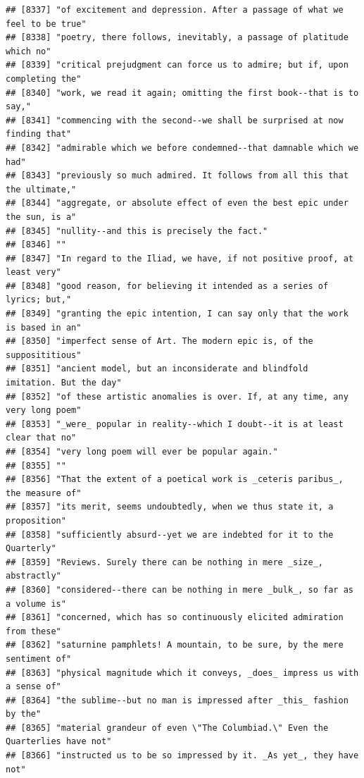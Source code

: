 \documentclass{article}\usepackage[]{graphicx}\usepackage[]{color}
\makeatletter
\newenvironment{kframe}{%
 \def\at@end@of@kframe{}%
 \ifinner\ifhmode%
  \def\at@end@of@kframe{\end{minipage}}%
  \begin{minipage}{\columnwidth}%
 \fi\fi%
 \def\FrameCommand##1{\hskip\@totalleftmargin \hskip-\fboxsep
 \colorbox{shadecolor}{##1}\hskip-\fboxsep
     \hskip-\linewidth \hskip-\@totalleftmargin \hskip\columnwidth}%
 \MakeFramed {\advance\hsize-\width
   \@totalleftmargin\z@ \linewidth\hsize
   \@setminipage}}%
 {\par\unskip\endMakeFramed%
 \at@end@of@kframe}
\newenvironment{knitrout}{}{} %
\makeatother
\begin{document}
\begin{knitrout}
\begin{kframe}
\begin{verbatim}
## [8337] "of excitement and depression. After a passage of what we feel to be true"    
## [8338] "poetry, there follows, inevitably, a passage of platitude which no"          
## [8339] "critical prejudgment can force us to admire; but if, upon completing the"    
## [8340] "work, we read it again; omitting the first book--that is to say,"            
## [8341] "commencing with the second--we shall be surprised at now finding that"       
## [8342] "admirable which we before condemned--that damnable which we had"             
## [8343] "previously so much admired. It follows from all this that the ultimate,"     
## [8344] "aggregate, or absolute effect of even the best epic under the sun, is a"     
## [8345] "nullity--and this is precisely the fact."                                    
## [8346] ""                                                                            
## [8347] "In regard to the Iliad, we have, if not positive proof, at least very"       
## [8348] "good reason, for believing it intended as a series of lyrics; but,"          
## [8349] "granting the epic intention, I can say only that the work is based in an"    
## [8350] "imperfect sense of Art. The modern epic is, of the supposititious"           
## [8351] "ancient model, but an inconsiderate and blindfold imitation. But the day"    
## [8352] "of these artistic anomalies is over. If, at any time, any very long poem"    
## [8353] "_were_ popular in reality--which I doubt--it is at least clear that no"      
## [8354] "very long poem will ever be popular again."                                  
## [8355] ""                                                                            
## [8356] "That the extent of a poetical work is _ceteris paribus_, the measure of"     
## [8357] "its merit, seems undoubtedly, when we thus state it, a proposition"          
## [8358] "sufficiently absurd--yet we are indebted for it to the Quarterly"            
## [8359] "Reviews. Surely there can be nothing in mere _size_, abstractly"             
## [8360] "considered--there can be nothing in mere _bulk_, so far as a volume is"      
## [8361] "concerned, which has so continuously elicited admiration from these"         
## [8362] "saturnine pamphlets! A mountain, to be sure, by the mere sentiment of"       
## [8363] "physical magnitude which it conveys, _does_ impress us with a sense of"      
## [8364] "the sublime--but no man is impressed after _this_ fashion by the"            
## [8365] "material grandeur of even \"The Columbiad.\" Even the Quarterlies have not"  
## [8366] "instructed us to be so impressed by it. _As yet_, they have not"             

\end{verbatim}
\end{kframe}
\end{knitrout}
\end{document}
